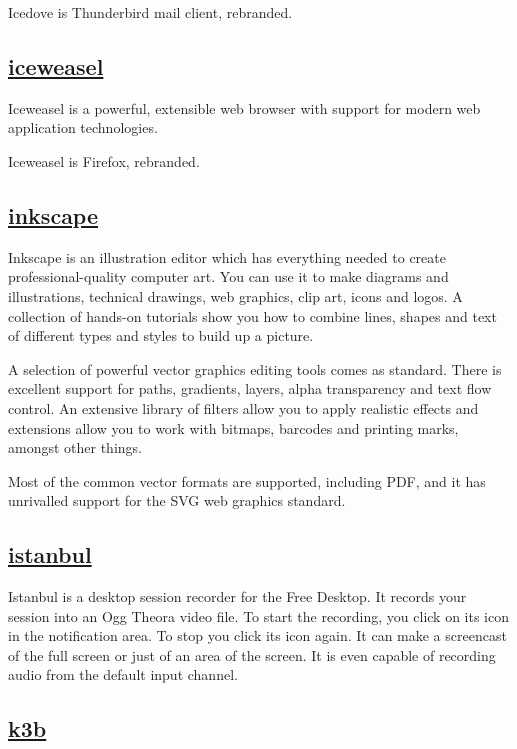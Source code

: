  Icedove is Thunderbird mail client, rebranded.

\subsection{\href{https://www.mozilla.org/en-US/firefox/desktop/}{iceweasel}}

 Iceweasel is a powerful, extensible web browser
 with support for modern web application technologies.

 Iceweasel is Firefox, rebranded.

\subsection{\href{http://www.inkscape.org/}{inkscape}}

 Inkscape is an illustration editor which has everything needed to
 create professional-quality computer art. You can use it to make
 diagrams and illustrations, technical drawings, web graphics, clip art,
 icons and logos. A collection of hands-on tutorials show you how to
 combine lines, shapes and text of different types and styles to build
 up a picture.
 
 A selection of powerful vector graphics editing tools comes as
 standard. There is excellent support for paths, gradients, layers,
 alpha transparency and text flow control. An extensive library of
 filters allow you to apply realistic effects and extensions allow you
 to work with bitmaps, barcodes and printing marks, amongst other things.
 
 Most of the common vector formats are supported, including PDF,
 and it has unrivalled support for the
 SVG web graphics standard.

\subsection{\href{http://live.gnome.org/Istanbul}{istanbul}}

 Istanbul is a desktop session recorder for the Free Desktop.
 It records your session into an Ogg Theora video file.
 To start the recording, you click on its icon in the
 notification area. To stop you click its icon again.
 It can make a screencast of the full screen or just of an
 area of the screen. It is even capable of recording audio
 from the default input channel.
 
\subsection{\href{http://www.k3b.org}{k3b}}

